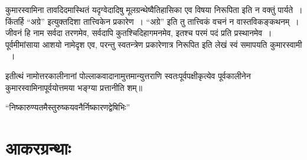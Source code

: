 \newpage

कुमारस्वामिना तावदिदमास्थितं यदृग्वेदादिषु मूलग्रन्थेष्वैतिहासिका एव विषया निरूपिता इति न वक्तुं पार्यते~। किंतर्हि “अग्रे” इत्युक्तदिशा तात्त्विकेन प्रकारेण~। “अग्रे” इति तु तात्त्विकं वचनं न वास्तविकङ्कथनम्~। जीवनं हि नाम सर्वदा तरणमेव, सर्वदापि कुतश्चिदिहागमनमेव, इतश्च परमं पदं प्रति प्रस्थानमेव~। पूर्वमीमांसाया आशयो नामेदृश एव, परन्तु स्वतन्त्रेण प्रकारेणात्र निरूपित इति लेखं स्वं समापयति कुमारस्वामी ~।

इतीत्थं नामोत्तरकालीनानां पोल्लाकवादानामुत्तमान्युत्तराणि स्वतःपूर्वपक्षीकृत्येव पूर्वकालीनेन कुमारस्वामिनापूर्वयोत्तमया भङ्ग्या प्रत्तानीति शम्॥

\begin{center}
“निष्कारुण्यतमैस्तुरुष्कयवनैर्निष्कारणद्वेषिभिः”
\end{center}
\egroup

\section*{आकरग्रन्थाः}

\retainauthsanskrit

